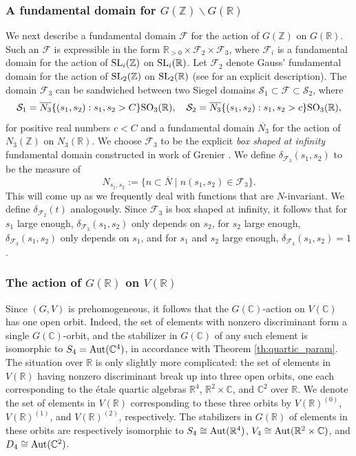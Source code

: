 \documentclass{article}
\def\Z{{\mathbb Z}}
\def\SL{{\rm SL}}
\def\SO{{\rm SO}}
\def\Aut{{\rm Aut}}
\def\R{{\mathbb R}}
\def\FF{{\mathcal F}}
\def\Z{{\mathbb Z}}
\def\C{{\mathbb C}}
\def\ol{\overline}
\begin{document}
\subsubsection*{A fundamental domain for $G(\Z)\backslash G(\R)$}
We next describe a fundamental domain $\FF$ for the action of
$G(\Z)$ on $G(\R)$. Such an $\FF$ is expressible in the form $\R_{>0}\times\FF_2\times\FF_3$, where $\FF_i$ is a fundamental domain for the action of $\SL_i(\Z)$ on $\SL_i(\R)$. Let $\FF_2$ denote Gauss' fundamental domain for the action of $\SL_2(\Z)$ on $\SL_2(\R)$ (see \cite[\S5.1]{BST} for an explicit description). The domain $\FF_3$ can be sandwiched between two Siegel domains $\mathcal{S}_1\subset\FF\subset\mathcal{S}_2$, where
\begin{equation*}
    \mathcal{S}_1=\overline{N_3}\{(s_1,s_2):s_1,s_2>C\}\SO_3(\R),\quad
    \mathcal{S}_2=\overline{N_3}\{(s_1,s_2):s_1,s_2>c\}\SO_3(\R),
\end{equation*}
for positive real numbers $c<C$ and a fundamental domain $\overline{N_3}$ for the action of $N_3(\Z)$ on $N_3(\R)$. We choose $\FF_3$ to be the explicit {\it box shaped at infinity} fundamental domain constructed in work of Grenier \cite[\S6]{MR934172}.
We define $\delta_{\FF_3}(s_1,s_2)$ to be the measure of $$N_{s_1,s_2}:=\{n\subset \ol{N}\mid n(s_1,s_2)\in \FF_3\}.$$ This will come up as we frequently deal with functions that are $N$-invariant.  We define $\delta_{\FF_2}(t)$ analogously. Since $\FF_3$ is box shaped at infinity, it follows that for $s_1$ large enough, $\delta_{\FF_3}(s_1,s_2)$ only depends on $s_2$, for $s_2$ large enough, $\delta_{\FF_3}(s_1,s_2)$ only depends on $s_1$, and for $s_1$ and $s_2$ large enough, 
$\delta_{\FF_3}(s_1,s_2)=1$.

\subsubsection*{The action of $G(\R)$ on $V(\R)$}
Since $(G,V)$ is prehomogeneous, it follows that the $G(\C)$-action on $V(\C)$ has one open orbit. Indeed, the set of elements with nonzero discriminant form a single $G(\C)$-orbit, and the stabilizer in $G(\C)$ of any such element is isomorphic to $S_4=\Aut(\C^4)$, in accordance with Theorem \ref{th:quartic_param}. The situation over $\R$ is only slightly more complicated: the set of elements in $V(\R)$ having nonzero discriminant break up into three open orbits, one each corresponding to the \'etale quartic algebras $\R^4$, $\R^2\times\C$, and $\C^2$ over $\R$. We denote the set of elements in $V(\R)$ corresponding to these three orbits by $V(\R)^{(0)}$, $V(\R)^{(1)}$, and $V(\R)^{(2)}$, respectively. The stabilizers in $G(\R)$ of elements in these orbits are respectively isomorphic to $S_4\cong\Aut(\R^4)$, $V_4\cong\Aut(\R^2\times\C)$, and $D_4\cong\Aut(\C^2)$.
\end{document}
